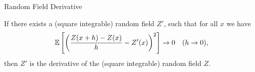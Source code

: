 \begin{frame}{Random Field Derivative}
	\begin{definition}
		If there exists a (square integrable) random field \(Z'\), such that for
		all \(x\) we have
		\[
			\mathbb{E}\left[\bigg(\frac{Z(x+h)-Z(x)}{h}-Z'(x)\bigg)^2\right] \to 0 \quad (h\to 0),
		\]	
		then \(Z'\) is the derivative of the (square integrable) random field
		\(Z\).
	\end{definition}

	 
\end{frame}